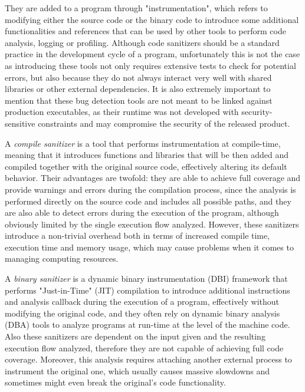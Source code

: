They are added to a program through "instrumentation", which refers to modifying either the source code or the binary code to introduce some additional functionalities and references that can be used by other tools to perform code analysis, logging or profiling. Although code sanitizers should be a standard practice in the development cycle of a program, unfortunately this is not the case as introducing these tools not only requires extensive tests to check for potential errors, but also because they do not always interact very well with shared libraries or other external dependencies. It is also extremely important to mention that these bug detection tools are not meant to be linked against production executables, as their runtime was not developed with security-sensitive constraints and may compromise the security of the released product. \cite{asan_docs}\cite{msan_docs}\cite{ubsan_docs}

A \textit{compile sanitizer} is a tool that performs instrumentation at compile-time, meaning that it introduces functions and libraries that will be then added and compiled together with the original source code, effectively altering its default behavior. Their advantages are twofold: they are able to achieve full coverage and provide warnings and errors during the compilation process, since the analysis is performed directly on the source code and includes all possible paths, and they are also able to detect errors during the execution of the program, although obviously limited by the single execution flow analyzed. However, these sanitizers introduce a non-trivial overhead both in terms of increased compile time, execution time and memory usage, which may cause problems when it comes to managing computing resources.

A \textit{binary sanitizer} is a dynamic binary instrumentation (DBI) framework that performs "Just-in-Time" (JIT) compilation to introduce additional instructions and analysis callback during the execution of a program, effectively without modifying the original code, and they often rely on dynamic binary analysis (DBA) tools to analyze programs at run-time at the level of the machine code. Also these sanitizers are dependent on the input given and the resulting execution flow analyzed, therefore they are not capable of achieving full code coverage. Moreover, this analysis requires attaching another external process to instrument the original one, which usually causes massive slowdowns and sometimes might even break the original's code functionality.  

